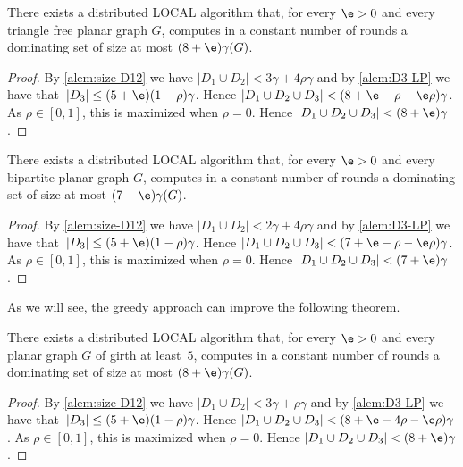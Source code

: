 
\begin{theorem}\label{thm:tri}
  There exists a distributed LOCAL algorithm that, for every $\e>0$ and every
  triangle free planar graph $G$, computes in a constant number of rounds a
  dominating set of size at most $(8+\e)\gamma(G)$.
\end{theorem}
\begin{proof}
  By \ref{alem:size-D12} we have $|D_1\cup D_2|<3\gamma+4\rho\gamma$ and
  by \ref{alem:D3-LP} we have that~$|D_3|\le (5+\e)(1-\rho)\gamma$.
  Hence $|D_1 \cup D_2 \cup D_3| < (8+\e -\rho-\e\rho)\gamma$.
  As $\rho\in[0,1]$, this is maximized when $\rho=0$. Hence
  \mbox{$|D_1 \cup D_2 \cup D_3|< (8+\e) \gamma$}.
\end{proof}

\begin{theorem}\label{thm:bip}
  There exists a distributed LOCAL algorithm that, for every $\e>0$ and
  every bipartite planar graph
  $G$, computes in a constant number of rounds a
  dominating set of size at most $(7+\e)\gamma(G)$.
\end{theorem}
\begin{proof}
  By \ref{alem:size-D12} we have $|D_1\cup D_2|<2\gamma+4\rho\gamma$ and
  by \ref{alem:D3-LP} we have that~$|D_3|\le (5+\e)(1-\rho)\gamma$.
  Hence $|D_1 \cup D_2 \cup D_3| < (7+\e-\rho-\e\rho)\gamma$.
  As $\rho\in[0,1]$, this is maximized when $\rho=0$. Hence
  \mbox{$|D_1 \cup D_2 \cup D_3|< (7+\e) \gamma$}.
\end{proof}

As we will see, the greedy approach can improve the following theorem.

\begin{theorem}\label{thm:girth}
  There exists a distributed LOCAL algorithm that, for every $\e>0$ and
  every planar graph
  $G$ of girth at least~$5$, computes in a constant number of rounds a
  dominating set of size at most $(8+\e)\gamma(G)$.
\end{theorem}
\begin{proof}
  By \ref{alem:size-D12} we have $|D_1\cup D_2|<3\gamma+\rho\gamma$ and
  by \ref{alem:D3-LP} we have that~$|D_3|\le (5+\e)(1-\rho)\gamma$.
  Hence $|D_1 \cup D_2 \cup D_3| < (8+\e-4\rho-\e\rho)\gamma$.
  As $\rho\in[0,1]$, this is maximized when $\rho=0$. Hence
  \mbox{$|D_1 \cup D_2 \cup D_3|< (8+\e) \gamma$}.
\end{proof}

